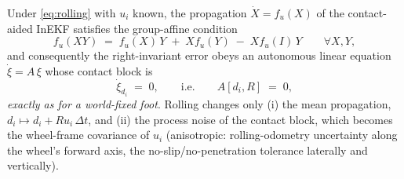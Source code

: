\begin{proposition}
\label{prop:rolling-group-affine}
Under \eqref{eq:rolling} with $u_i$ known, the propagation
$\dot X = f_{u}(X)$ of the contact-aided InEKF satisfies the group-affine
condition
\begin{equation}
  \label{eq:group-affine}
  f_u(XY) \;=\; f_u(X)\,Y \;+\; X f_u(Y) \;-\; X f_u(I)\, Y
  \qquad \forall X, Y,
\end{equation}
and consequently the right-invariant error obeys an autonomous linear equation
$\dot\xi = A\,\xi$ whose contact block is
\begin{equation}
  \label{eq:A-rolling}
  \dot\xi_{d_i} \;=\; 0, \qquad\text{i.e.}\qquad A[d_i, R] \;=\; 0 ,
\end{equation}
\emph{exactly as for a world-fixed foot}. Rolling changes only (i) the mean
propagation, $d_i \mapsto d_i + R u_i \,\Delta t$, and (ii) the process noise
of the contact block, which becomes the wheel-frame covariance of $u_i$
(anisotropic: rolling-odometry uncertainty along the wheel's forward axis,
the no-slip/no-penetration tolerance laterally and vertically).
\end{proposition}


